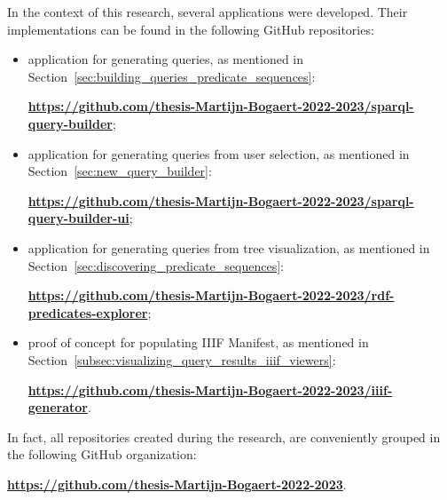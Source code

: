 \begin{appendices}
In the context of this research, several applications were developed. Their implementations can be found in the following GitHub repositories:

\begin{itemize}
    \item application for generating queries, as mentioned in Section~\ref{sec:building_queries_predicate_sequences}:
        \begin{center}
            \textbf{\url{https://github.com/thesis-Martijn-Bogaert-2022-2023/sparql-query-builder}};
        \end{center}
    \item application for generating queries from user selection, as mentioned in Section~\ref{sec:new_query_builder}:
        \begin{center}
            \textbf{\url{https://github.com/thesis-Martijn-Bogaert-2022-2023/sparql-query-builder-ui}};
        \end{center}
    \item application for generating queries from tree visualization, as mentioned in Section~\ref{sec:discovering_predicate_sequences}:
        \begin{center}
            \textbf{\url{https://github.com/thesis-Martijn-Bogaert-2022-2023/rdf-predicates-explorer}};
        \end{center}
    \item proof of concept for populating IIIF Manifest, as mentioned in Section~\ref{subsec:visualizing_query_results_iiif_viewers}:
        \begin{center}
            \textbf{\url{https://github.com/thesis-Martijn-Bogaert-2022-2023/iiif-generator}}.
        \end{center}
\end{itemize}

In fact, all repositories created during the research, are conveniently grouped in the following GitHub organization:
\begin{center}
        \textbf{\url{https://github.com/thesis-Martijn-Bogaert-2022-2023}}.
\end{center}

\end{appendices}
